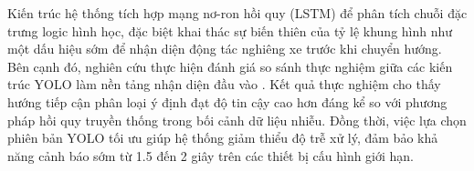 \documentclass[12pt,a4paper]{report}
\begin{document}
	Kiến trúc hệ thống tích hợp mạng nơ-ron hồi quy (LSTM) để phân tích chuỗi đặc trưng logic hình học, đặc biệt khai thác sự biến thiên của tỷ lệ khung hình như một dấu hiệu sớm để nhận diện động tác nghiêng xe trước khi chuyển hướng. Bên cạnh đó, nghiên cứu thực hiện đánh giá so sánh thực nghiệm giữa các kiến trúc YOLO làm nền tảng nhận diện đầu vào \cite{Hidayatullah2025YOLOv8TY,Lv2023DETRsBY}. Kết quả thực nghiệm cho thấy hướng tiếp cận phân loại ý định đạt độ tin cậy cao hơn đáng kể so với phương pháp hồi quy truyền thống trong bối cảnh dữ liệu nhiễu. Đồng thời, việc lựa chọn phiên bản YOLO tối ưu giúp hệ thống giảm thiểu độ trễ xử lý, đảm bảo khả năng cảnh báo sớm từ 1.5 đến 2 giây trên các thiết bị cấu hình giới hạn.
	
	
	
	
	
	
	
	
	
	\clearpage
	
	\renewcommand{\bibname}{DANH MỤC TÀI LIỆU THAM KHẢO}
	
	
	\begingroup
	\raggedright
	
	\endgroup
	
\end{document}
